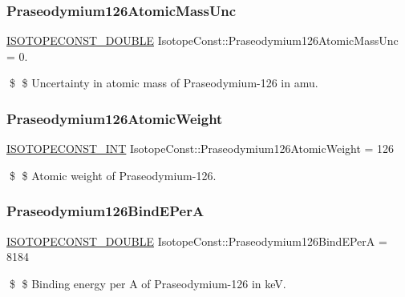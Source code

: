 \subsubsection{\texorpdfstring{Praseodymium126\+Atomic\+Mass\+Unc}{Praseodymium126AtomicMassUnc}}
{\footnotesize\ttfamily \mbox{\hyperlink{group___isotope_const-_macros_ga8f45a7272ce02c0b4c65c44636ed719a}{I\+S\+O\+T\+O\+P\+E\+C\+O\+N\+S\+T\+\_\+\+D\+O\+U\+B\+LE}} Isotope\+Const\+::\+Praseodymium126\+Atomic\+Mass\+Unc = 0.}

\$ \$ Uncertainty in atomic mass of Praseodymium-\/126 in amu. \mbox{\label{group___isotope_const-_praseodymium-_pr126_ga871e0690b037522643675a485f62c634}} 
\subsubsection{\texorpdfstring{Praseodymium126\+Atomic\+Weight}{Praseodymium126AtomicWeight}}
{\footnotesize\ttfamily \mbox{\hyperlink{group___isotope_const-_macros_ga5f18360b3e99483a35c32d789e62621c}{I\+S\+O\+T\+O\+P\+E\+C\+O\+N\+S\+T\+\_\+\+I\+NT}} Isotope\+Const\+::\+Praseodymium126\+Atomic\+Weight = 126}

\$ \$ Atomic weight of Praseodymium-\/126. \mbox{\label{group___isotope_const-_praseodymium-_pr126_ga5a7b3df089be2f7a537bce32b7ddbdf7}} 
\subsubsection{\texorpdfstring{Praseodymium126\+Bind\+E\+PerA}{Praseodymium126BindEPerA}}
{\footnotesize\ttfamily \mbox{\hyperlink{group___isotope_const-_macros_ga8f45a7272ce02c0b4c65c44636ed719a}{I\+S\+O\+T\+O\+P\+E\+C\+O\+N\+S\+T\+\_\+\+D\+O\+U\+B\+LE}} Isotope\+Const\+::\+Praseodymium126\+Bind\+E\+PerA = 8184}

\$ \$ Binding energy per A of Praseodymium-\/126 in keV. \mbox{\label{group___isotope_const-_praseodymium-_pr126_gacc246ca52c2f5f55c72144723a2b5b66}} 
